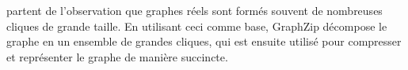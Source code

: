 	
	\citep{rossi2018graphzip} partent de l'observation que graphes  réels sont formés souvent de nombreuses cliques de grande taille. En utilisant ceci comme base, GraphZip décompose le graphe en un ensemble de grandes cliques, qui est ensuite utilisé pour compresser et représenter le graphe de manière succincte. 
